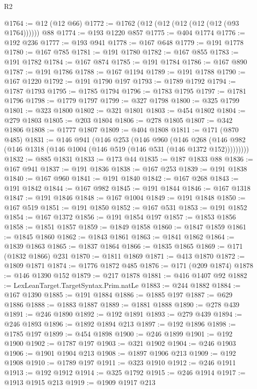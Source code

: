\begin{lexlean}{R2}
\begin{coremodule}
@1764 := @12 (@12 @66)
@1772 := @1762 (@12 (@12 (@12 (@12 (@12 (@93 @1764)))))) @88
@1774 := @193 @1220 @857
@1775 := @404 @1774
@1776 := @192 @236
@1777 := @193 @941
@1778 := @167 @648
@1779 := @191 @1778
@1780 := @167 @785
@1781 := @191 @1780
@1782 := @167 @855
@1783 := @191 @1782
@1784 := @167 @874
@1785 := @191 @1784
@1786 := @167 @890
@1787 := @191 @1786
@1788 := @167 @1194
@1789 := @191 @1788
@1790 := @167 @1220
@1792 := @191 @1790 @197
@1793 := @1789 @1792
@1794 := @1787 @1793
@1795 := @1785 @1794
@1796 := @1783 @1795
@1797 := @1781 @1796
@1798 := @1779 @1797
@1799 := @327 @1798
@1800 := @325 @1799
@1801 := @323 @1800
@1802 := @321 @1801
@1803 := @454 @1802
@1804 := @279 @1803
@1805 := @203 @1804
@1806 := @278 @1805
@1807 := @342 @1806
@1808 := @1777 @1807
@1809 := @404 @1808
@1811 := @171 (@870 @485)
@1831 := @146
    @941
    (@146
      @253
      (@146
        @960
        (@146
          @268
          (@146 @982 (@146 @1318 (@146 @1004 (@146 @519 (@146 @531 (@146 @1372 @152)))))))))
@1832 := @885 @1831
@1833 := @173 @44
@1835 := @187 @1833 @88
@1836 := @167 @941
@1837 := @191 @1836
@1838 := @167 @253
@1839 := @191 @1838
@1840 := @167 @960
@1841 := @191 @1840
@1842 := @167 @268
@1843 := @191 @1842
@1844 := @167 @982
@1845 := @191 @1844
@1846 := @167 @1318
@1847 := @191 @1846
@1848 := @167 @1004
@1849 := @191 @1848
@1850 := @167 @519
@1851 := @191 @1850
@1852 := @167 @531
@1853 := @191 @1852
@1854 := @167 @1372
@1856 := @191 @1854 @197
@1857 := @1853 @1856
@1858 := @1851 @1857
@1859 := @1849 @1858
@1860 := @1847 @1859
@1861 := @1845 @1860
@1862 := @1843 @1861
@1863 := @1841 @1862
@1864 := @1839 @1863
@1865 := @1837 @1864
@1866 := @1835 @1865
@1869 := @171 (@1832 @1866) @231
@1870 := @1811 @1869
@1871 := @413 @1870
@1872 := @1809 @1871
@1874 := @1776 @1872 @485
@1876 := @171 (@209 @1874)
@1878 := @146 @1390 @152
@1879 := @217 @1878
@1881 := @416 @1407 @92
@1882 := LexLeanTarget.TargetSyntax.Prim.natLe
@1883 := @244 @1882
@1884 := @167 @1390
@1885 := @191 @1884
@1886 := @1885 @197
@1887 := @629 @1886
@1888 := @1883 @1887
@1889 := @1881 @1888
@1890 := @278 @439
@1891 := @246 @1890
@1892 := @192 @1891
@1893 := @279 @439
@1894 := @246 @1893
@1896 := @1892 @1894 @213
@1897 := @192 @1896
@1898 := @1785 @197
@1899 := @454 @1898
@1900 := @246 @1899
@1901 := @192 @1900
@1902 := @1787 @197
@1903 := @321 @1902
@1904 := @246 @1903
@1906 := @1901 @1904 @213
@1908 := @1897 @1906 @213
@1909 := @192 @1908
@1910 := @1789 @197
@1911 := @323 @1910
@1912 := @246 @1911
@1913 := @192 @1912
@1914 := @325 @1792
@1915 := @246 @1914
@1917 := @1913 @1915 @213
@1919 := @1909 @1917 @213

\end{coremodule}
\end{lexlean}

